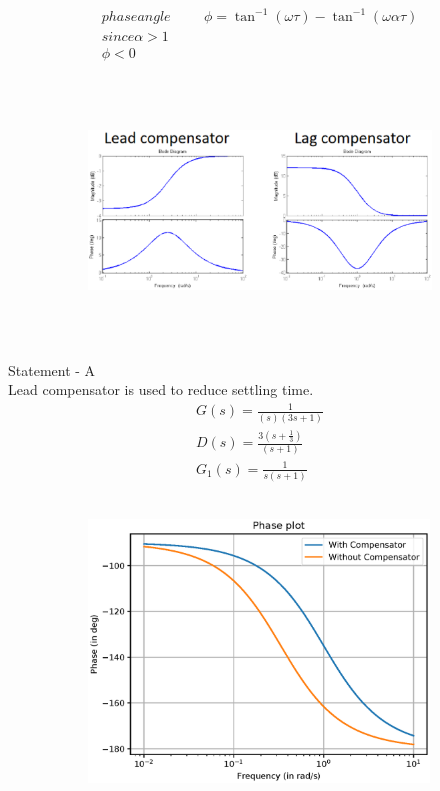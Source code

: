 \begin{enumerate}[label=\thesection.\arabic*.,ref=\thesection.\theenumi]
\begin{align}
phase angle \hspace{1cm}\phi = \tan^{-1} {(\omega\tau)} - \tan^{-1}{(\omega\alpha\tau)}\\
since \alpha > 1\\
\phi < 0
\end{align}



\begin{figure}[h]
 
\begin{subfigure}{\textwidth}
\includegraphics[width=1\linewidth, height=7cm ,inner]{./figs/ee18btech11027/Screen.eps} 
\label{fig:subim1}
\end{subfigure}
\end{figure}


Statement - A\\Lead compensator is used to reduce settling time.
\begin{align}
G(s) = \frac{1}{(s)(3s+1)}\\
D(s) = \frac{3(s+\frac{1}{3})}{(s+1)} \\
G_{1}(s) = \frac{1}{s(s+1)}
\end{align}
\\
\begin{figure}
\begin{subfigure}{\textwidth}
\includegraphics[width=1\linewidth, height=7cm ,inner]{./figs/ee18btech11027/lead_compensator_phase.eps} 
\label{fig:subim1}
\end{subfigure}
\end{figure}


\end{enumerate}
